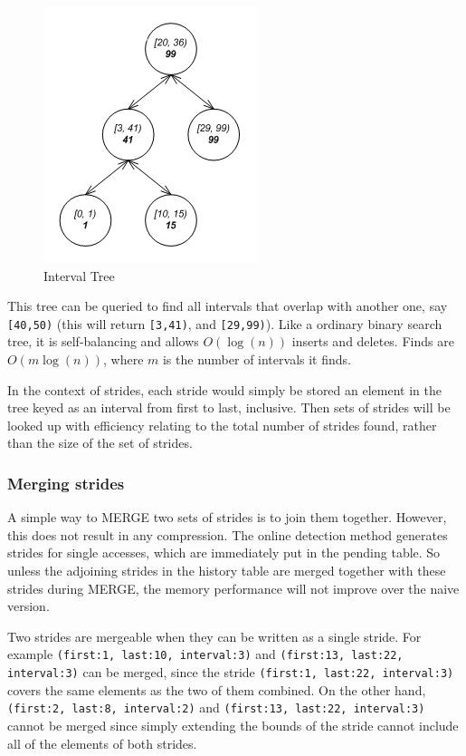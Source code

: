 \documentclass[12pt,twoside]{reedthesis}
\begin{document}
		\begin{figure}[h]
			\caption{Interval Tree}
			\label{fig:interval-tree}
			\includegraphics[scale=0.5]{interval-tree}
		\end{figure}
		
		This tree can be queried to find all intervals that overlap with another one, say \texttt{[40,50)} (this will return \texttt{[3,41)}, and \texttt{[29,99)}). Like a ordinary binary search tree, it is self-balancing and allows $O(\log(n))$ inserts and deletes. Finds are $O(m\log(n))$, where $m$ is the number of intervals it finds. 
		
		In the context of strides, each stride would simply be stored  an element in the tree keyed as an interval from first to last, inclusive. Then sets of strides will be looked up with efficiency relating to the total number of strides found, rather than the size of the set of strides. 
		
		\subsubsection{Merging strides}
		
		A simple way to MERGE two sets of strides is to join them together. However, this does not result in any compression. The online detection method generates strides for single accesses, which are immediately put in the pending table. So unless the adjoining strides in the history table are merged together with these strides during MERGE, the memory performance will not improve over the naive version. 
		
		Two strides are mergeable when they can be written as a single stride. For example \texttt{(first:1, last:10, interval:3)} and  \texttt{(first:13, last:22, interval:3)} can be merged, since the stride  \texttt{(first:1, last:22, interval:3)} covers the same elements as the two of them combined. On the other hand, \texttt{(first:2, last:8, interval:2)} and \texttt{(first:13, last:22, interval:3)} cannot be merged since simply extending the bounds of the stride cannot include all of the elements of both strides.
		
\end{document}
